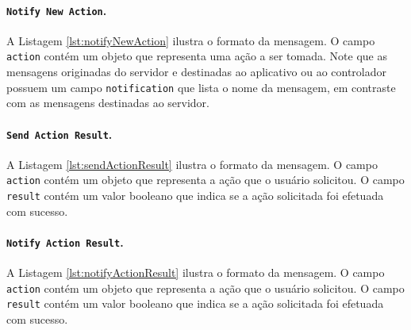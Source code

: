 \noindent
\begin{minipage}[l]{\linewidth}

\end{minipage}

\paragraph*{\texttt{Notify New Action}.} A Listagem \ref{lst:notifyNewAction} ilustra o formato da mensagem. O campo \texttt{action} contém um objeto que representa uma ação a ser tomada. Note que as mensagens originadas do servidor e destinadas ao aplicativo ou ao controlador possuem um campo \texttt{notification} que lista o nome da mensagem, em contraste com as mensagens destinadas ao servidor.

\noindent
\begin{minipage}[l]{\linewidth}

\end{minipage}

\paragraph*{\texttt{Send Action Result}.} A Listagem \ref{lst:sendActionResult} ilustra o formato da mensagem. O campo \texttt{action} contém um objeto que representa a ação que o usuário solicitou. O campo \texttt{result} contém um valor booleano que indica se a ação solicitada foi efetuada com sucesso.

\noindent
\begin{minipage}{\linewidth}

\end{minipage}

\paragraph*{\texttt{Notify Action Result}.} A Listagem \ref{lst:notifyActionResult} ilustra o formato da mensagem. O campo \texttt{action} contém um objeto que representa a ação que o usuário solicitou. O campo \texttt{result} contém um valor booleano que indica se a ação solicitada foi efetuada com sucesso.

\noindent
\begin{minipage}{\linewidth}

\end{minipage}

